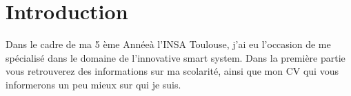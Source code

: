 \chapter{Introduction}
\thispagestyle{fancy}


Dans le cadre de ma 5 ème Annéeà l'INSA Toulouse, j'ai eu l'occasion de me spécialisé dans le domaine de l'innovative smart system.
Dans la première partie vous retrouverez des informations sur ma scolarité, ainsi que mon CV qui vous informerons un peu mieux sur qui je suis.
